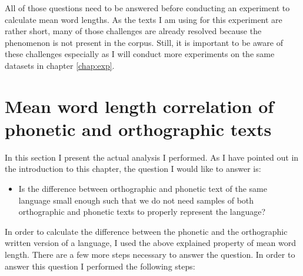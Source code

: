 All of those questions need to be answered before conducting an experiment to calculate mean word lengths. As the texts I am using for this experiment are rather short, many of those challenges are already resolved because the phenomenon is not present in the corpus. Still, it is important to be aware of these challenges especially as I will conduct more experiments on the same datasets in chapter \ref{chap:exp}.

\section{Mean word length correlation of phonetic and orthographic texts}
\label{sec:mean-len-experiment}
In this section I present the actual analysis I performed. As I have pointed out in the introduction to this chapter, the question I would like to answer is:

\begin{itemize}
    \item Is the difference between orthographic and phonetic text of the same language small enough such that we do not need samples of both orthographic and phonetic texts to properly represent the language?
\end{itemize}

In order to calculate the difference between the phonetic and the orthographic written version of a language, I used the above explained property of mean word length. There are a few more steps necessary to answer the question. In order to answer this question I performed the following steps:


